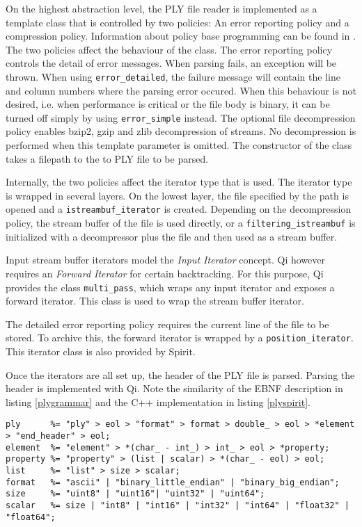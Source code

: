 On the highest abstraction level, the PLY file reader is implemented as a
template class that is controlled by two policies: An error reporting policy and
a compression policy. Information about policy base programming can be found in
\cite{Alexandrescu:2001:MCD:377789}. The two policies affect the behaviour of
the class. The error reporting policy controls the detail of error messages.
When parsing fails, an exception will be thrown. When using
\texttt{error\_detailed}, the failure message will contain the line and column
numbers where the parsing error occured. When this behaviour is not desired,
i.e. when performance is critical or the file body is binary, it can be turned
off simply by using \texttt{error\_simple} instead. The optional file
decompression policy enables bzip2, gzip and zlib decompression of streams.
No decompression is performed when this template parameter is omitted.
The constructor of the class takes a filepath to the to PLY file to be parsed.

Internally, the two policies affect the iterator type that is used. The iterator
type is wrapped in several layers. On the lowest layer, the file specified by
the path is opened and a \texttt{istreambuf_iterator} is created. Depending on
the decompression policy, the stream buffer of the file is used directly, or a
\texttt{filtering_istreambuf} is initialized with a decompressor plus the file
and then used as a stream buffer.

Input stream buffer iterators model the \emph{Input Iterator} concept. Qi
however requires an \emph{Forward Iterator} for certain backtracking. For this
purpose, Qi provides the class \texttt{multi\_pass}, which wraps any input
iterator and exposes a forward iterator. This class is used to wrap the stream
buffer iterator.

The detailed error reporting policy requires the current line of the file to be
stored. To archive this, the forward iterator is wrapped by a
\texttt{position\_iterator}. This iterator class is also provided by Spirit.


Once the iterators are all set up, the header of the PLY file is parsed. Parsing
the header is implemented with Qi. Note the similarity of the EBNF description
in listing \ref{plygrammar} and the C++ implementation in listing
\ref{plyspirit}.

\begin{lstlisting}[label=plyspirit, float=*,frame=tb,caption=C++ Grammar of the PLY file header]
ply      %= "ply" > eol > "format" > format > double_ > eol > *element > "end_header" > eol;
element  %= "element" > *(char_ - int_) > int_ > eol > *property;
property %= "property" > (list | scalar) > *(char_ - eol) > eol;
list     %= "list" > size > scalar;
format   %= "ascii" | "binary_little_endian" | "binary_big_endian";
size     %= "uint8" | "uint16"| "uint32" | "uint64";
scalar   %= size | "int8" | "int16" | "int32" | "int64" | "float32" | "float64";
\end{lstlisting}


